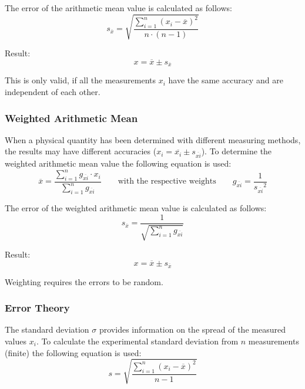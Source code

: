 The error of the arithmetic mean value is calculated as follows:
\begin{equation}
s_{\overline x}=\sqrt{\frac{\sum\limits_{i=1}^{n}\left(x_i - \overline x\right)^2}{n\cdot(n-1)}}
\label{eq:Arithmetic_Mean_Error}
\end{equation}

Result:
\begin{equation}
x=\overline x \pm s_{\overline x}
\label{eq:Arithmetic_Mean_Result}
\end{equation}

This is only valid, if all the measurements $x_i$ have the same accuracy and are independent of each other.

\subsubsection{Weighted Arithmetic Mean}
\label{subsubsec:Weighted_Arithmetic_Mean}
When a physical quantity has been determined with different measuring methods, the results may have different accuracies ($x_i={\overline{x_i}}\pm s_{\overline{xi}}$). To determine the weighted arithmetic mean value the following equation is used:
\begin{equation}
\overline x=\frac{\sum\limits_{i=1}^{n}g_{\overline {xi}}\cdot x_i}{\sum\limits_{i=1}^{n}g_{\overline {xi}}} \qquad \text{with the respective weights} \qquad g_{\overline {xi}}=\frac{1}{{s_{\overline {xi}}}^2}
\label{eq:Weighted_Arithmetic_Mean}
\end{equation}

The error of the weighted arithmetic mean value is calculated as follows:
\begin{equation}
s_{\overline x}=\frac{1}{\sqrt{\sum\limits_{i=1}^{n}g_{\overline {xi}}}}
\label{eq:Weighted_Arithmetic_Mean_Error}
\end{equation}

Result:
\begin{equation}
x=\overline x \pm s_{\overline x}
\label{eq:Weighted_Arithmetic_Mean_Result}
\end{equation}

Weighting requires the errors to be random.

\subsubsection{Error Theory}
\label{subsubsec:Error_Theory}
The standard deviation $\sigma$ provides information on the spread of the measured values $x_i$. To calculate the experimental standard deviation from $n$ measurements (finite) the following equation is used:
\begin{equation}
s=\sqrt{\frac{\sum\limits_{i=1}^{n}\left(x_i - \overline x\right)^2}{n-1}}
\label{eq:Experimental_Standard_Deviation}
\end{equation}

